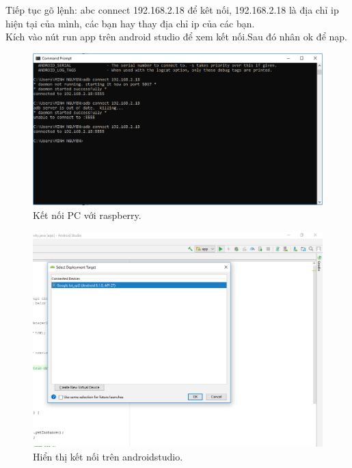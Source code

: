 Tiếp tục gõ lệnh: abc connect 192.168.2.18 để kêt nối, 192.168.2.18 là địa chỉ ip hiện tại của mình, các bạn hay thay địa chỉ ip của các bạn.\\
Kích vào nút run app trên android studio để xem kết nối.Sau đó nhân ok để nạp.
\begin{center}
    \begin{figure}[htp]
    \begin{center}
     \includegraphics[scale=0.5]{image3/adbketnoi}
    \end{center}
    \caption{Kết nối PC với raspberry.}
    \label{refhinh1}
    \end{figure}
\end{center}
\newpage
\begin{center}
    \begin{figure}[htp]
    \begin{center}
     \includegraphics[scale=0.5]{image3/androidketnoi}
    \end{center}
    \caption{Hiển thị kết nối trên androidstudio.}
    \label{refhinh1}
    \end{figure}
\end{center}

